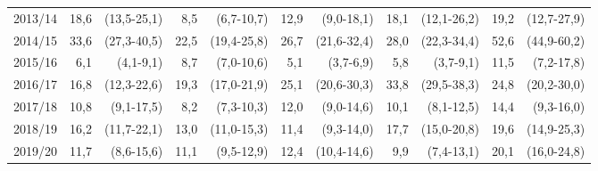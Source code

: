 \begin{table}[H]
\begin{tabular}{|c|*{5}{rr|}}
        2013/14 & 18,6 & (13,5-25,1) &  8,5 &  (6,7-10,7) & 12,9 &  (9,0-18,1) & 18,1 & (12,1-26,2) & 19,2 & (12,7-27,9) \\
        2014/15 & 33,6 & (27,3-40,5) & 22,5 & (19,4-25,8) & 26,7 & (21,6-32,4) & 28,0 & (22,3-34,4) & 52,6 & (44,9-60,2) \\
        2015/16 &  6,1 &   (4,1-9,1) &  8,7 &  (7,0-10,6) &  5,1 &   (3,7-6,9) &  5,8 &   (3,7-9,1) & 11,5 &  (7,2-17,8) \\
        2016/17 & 16,8 & (12,3-22,6) & 19,3 & (17,0-21,9) & 25,1 & (20,6-30,3) & 33,8 & (29,5-38,3) & 24,8 & (20,2-30,0) \\
        2017/18 & 10,8 &  (9,1-17,5) &  8,2 &  (7,3-10,3) & 12,0 &  (9,0-14,6) & 10,1 &  (8,1-12,5) & 14,4 &  (9,3-16,0) \\
        2018/19 & 16,2 & (11,7-22,1) & 13,0 & (11,0-15,3) & 11,4 &  (9,3-14,0) & 17,7 & (15,0-20,8) & 19,6 & (14,9-25,3) \\
        2019/20 & 11,7 &  (8,6-15,6) & 11,1 &  (9,5-12,9) & 12,4 & (10,4-14,6) &  9,9 &  (7,4-13,1) & 20,1 & (16,0-24,8) \\

        \hline
    \end{tabular}

\end{table}
